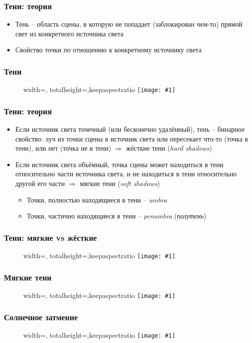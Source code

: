 \documentclass[10pt,handout]{beamer}
\newcommand{\slideimage}[1]{
  \begin{figure}
    \begin{adjustbox}{width=\textwidth, totalheight=\textheight-2\baselineskip-2\baselineskip,keepaspectratio}
      \texttt{[image: \#1]}
    \end{adjustbox}
  \end{figure}
}
\begin{document}
\begin{frame}[fragile]
\frametitle{Тени: теория}
\begin{itemize}
\item Тень -- область сцены, в которую не попадает (заблокирован чем-то) прямой свет из конкретного источника света
\item Свойство точки по отношению к конкретному источнику света
\end{itemize}
\end{frame}

\begin{frame}[fragile]
\frametitle{Тени}
\slideimage{shadows1.png}
\end{frame}

\begin{frame}[fragile]
\frametitle{Тени: теория}
\begin{itemize}
\item Если источник света точечный (или бесконечно удалённый), тень -- бинарное свойство: луч из точки сцены в источник света или пересекает что-то (точка в тени), или нет (точка не в тени) \begin{math}\Longrightarrow\end{math} жёсткие тени (\textit{hard shadows})
\pause
\item Если источник света объёмный, точка сцены может находиться в тени относительно части источника света, и не находиться в тени относительно другой его части \begin{math}\Longrightarrow\end{math} мягкие тени (\textit{soft shadows})
\pause
\begin{itemize}
\item Точки, полностью находящиеся в тени -- \textit{umbra}
\item Точки, частично находящиеся в тени -- \textit{penumbra} (\textit{полутень})
\end{itemize}
\end{itemize}
\end{frame}

\begin{frame}[fragile]
\frametitle{Тени: мягкие vs жёсткие}
\slideimage{shadow-scheme1.png}
\end{frame}

\begin{frame}[fragile]
\frametitle{Мягкие тени}
\slideimage{shadows2.png}
\end{frame}

\begin{frame}[fragile]
\frametitle{Солнечное затмение}
\slideimage{eclipse.png}
\end{frame}
\end{document}

